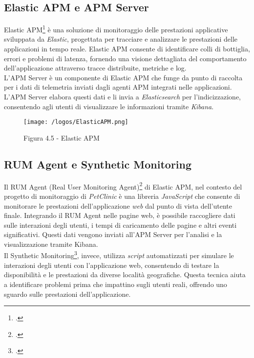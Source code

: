 \vspace{1em}

\subsection*{Elastic APM e APM Server}
Elastic APM\footcite{site:apm} è una soluzione di monitoraggio delle prestazioni applicative sviluppata da \emph{Elastic}, progettata per tracciare e analizzare le prestazioni delle applicazioni in tempo reale. Elastic APM consente di identificare colli di bottiglia, errori e problemi di latenza, fornendo una visione dettagliata del comportamento dell'applicazione attraverso tracce distribuite, metriche e log. \\
L'APM Server è un componente di Elastic APM che funge da punto di raccolta per i dati di telemetria inviati dagli agenti APM integrati nelle applicazioni. L'APM Server elabora questi dati e li invia a \emph{Elasticsearch} per l'indicizzazione, consentendo agli utenti di visualizzare le informazioni tramite \emph{Kibana}.
\begin{figure}[H] 
    \centering 
    \texttt{[image: /logos/ElasticAPM.png]} 
    \caption{Figura 4.5 - Elastic APM}
\end{figure}

\vspace{1em}

\subsection*{RUM Agent e Synthetic Monitoring}
Il RUM Agent (Real User Monitoring Agent)\footcite{site:rum-js} di Elastic APM, nel contesto del progetto di monitoraggio di \emph{PetClinic} è una libreria \emph{JavaScript} che consente di monitorare le prestazioni dell'applicazione \emph{web} dal punto di vista dell'utente finale. Integrando il RUM Agent nelle pagine web, è possibile raccogliere dati sulle interazioni degli utenti, i tempi di caricamento delle pagine e altri eventi significativi. Questi dati vengono inviati all'APM Server per l'analisi e la visualizzazione tramite Kibana. \\
Il Synthetic Monitoring\footcite{site:synthetic}, invece, utilizza \emph{script} automatizzati per simulare le interazioni degli utenti con l'applicazione web, consentendo di testare la disponibilità e le prestazioni da diverse località geografiche. Questa tecnica aiuta a identificare problemi prima che impattino sugli utenti reali, offrendo uno sguardo sulle prestazioni dell'applicazione.


